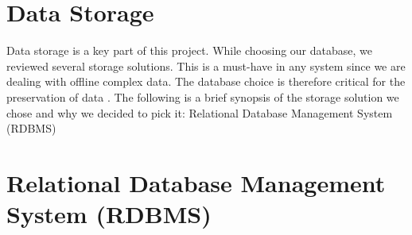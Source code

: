 \section{Data Storage}

Data storage is a key part of this project. While choosing our database, we reviewed several storage solutions. This is a must-have in any system since we are dealing with offline complex data. The database choice is therefore critical for the preservation of data \cite{DS}. The following is a brief synopsis of the storage solution we chose and why we decided to pick it:
Relational Database Management System (RDBMS) 

\section{Relational Database Management System (RDBMS)}

